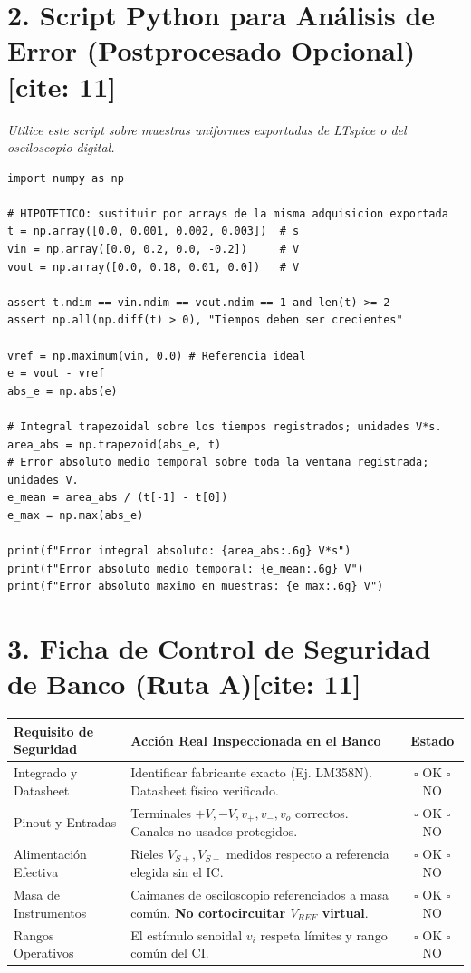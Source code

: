 \documentclass[10pt, a4paper]{article}
\begin{document}
\section*{2. Script Python para Análisis de Error (Postprocesado Opcional)[cite: 11]}
\textit{Utilice este script sobre muestras uniformes exportadas de LTspice o del osciloscopio digital.}
\begin{lstlisting}[style=pythonstyle]
import numpy as np

# HIPOTETICO: sustituir por arrays de la misma adquisicion exportada
t = np.array([0.0, 0.001, 0.002, 0.003])  # s
vin = np.array([0.0, 0.2, 0.0, -0.2])     # V
vout = np.array([0.0, 0.18, 0.01, 0.0])   # V

assert t.ndim == vin.ndim == vout.ndim == 1 and len(t) >= 2
assert np.all(np.diff(t) > 0), "Tiempos deben ser crecientes"

vref = np.maximum(vin, 0.0) # Referencia ideal
e = vout - vref
abs_e = np.abs(e)

# Integral trapezoidal sobre los tiempos registrados; unidades V*s.
area_abs = np.trapezoid(abs_e, t)
# Error absoluto medio temporal sobre toda la ventana registrada; unidades V.
e_mean = area_abs / (t[-1] - t[0])
e_max = np.max(abs_e)

print(f"Error integral absoluto: {area_abs:.6g} V*s")
print(f"Error absoluto medio temporal: {e_mean:.6g} V")
print(f"Error absoluto maximo en muestras: {e_max:.6g} V")
\end{lstlisting}

\section*{3. Ficha de Control de Seguridad de Banco (Ruta A)[cite: 11]}
\begin{table}[htbp]
    \centering
    \footnotesize
    \renewcommand{\arraystretch}{1.4}
    \begin{tabularx}{\textwidth}{|P{3.5cm}|X|c|}
    \hline
    \textbf{Requisito de Seguridad} & \textbf{Acción Real Inspeccionada en el Banco} & \textbf{Estado} \\ \hline
    Integrado y Datasheet & Identificar fabricante exacto (Ej. LM358N). Datasheet físico verificado. & $\square$ OK $\square$ NO \\ \hline
    Pinout y Entradas & Terminales $+V, -V, v_+, v_-, v_o$ correctos. Canales no usados protegidos. & $\square$ OK $\square$ NO \\ \hline
    Alimentación Efectiva & Rieles $V_{S+}, V_{S-}$ medidos respecto a referencia elegida sin el IC. & $\square$ OK $\square$ NO \\ \hline
    Masa de Instrumentos & Caimanes de osciloscopio referenciados a masa común. \textbf{No cortocircuitar $V_{REF}$ virtual}. & $\square$ OK $\square$ NO \\ \hline
    Rangos Operativos & El estímulo senoidal $v_i$ respeta límites y rango común del CI. & $\square$ OK $\square$ NO \\ \hline
    \end{tabularx}
\end{table}
\end{document}
